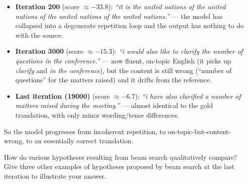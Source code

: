 \begin{parts}
\begin{subparts}
{        \begin{itemize}
            \item \textbf{Iteration 200} (score $\approx -33.8$): \emph{``it is the united nations of the united nations of the united nations of the united nations.''} --- the model has collapsed into a degenerate repetition loop and the output has nothing to do with the source.
            \item \textbf{Iteration 3000} (score $\approx -15.3$): \emph{``i would also like to clarify the number of questions in the conference.''} --- now fluent, on-topic English (it picks up \emph{clarify} and \emph{in the conference}), but the content is still wrong (``number of questions'' for the matters raised) and it drifts from the reference.
            \item \textbf{Last iteration (19000)} (score $\approx -6.7$): \emph{``i have also clarified a number of matters raised during the meeting.''} --- almost identical to the gold translation, with only minor wording/tense differences.
        \end{itemize}

        So the model progresses from incoherent repetition, to on-topic-but-content-wrong, to an essentially correct translation.
        }

        \subpart[2] How do various hypotheses resulting from beam search qualitatively compare? Give three other examples of hypotheses proposed by beam search at the last iteration to illustrate your answer.

\end{subparts}
\end{parts}
